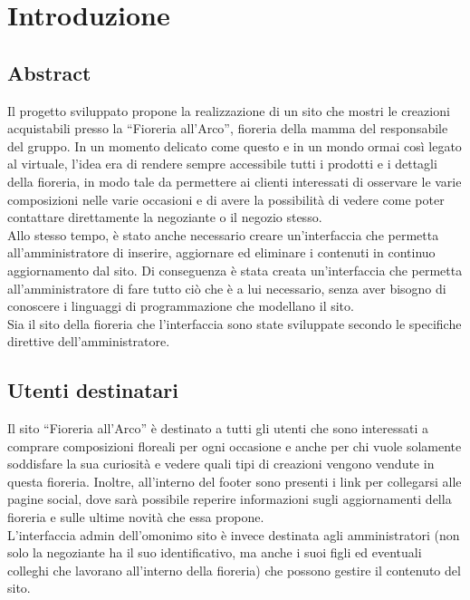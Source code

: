 \section{Introduzione}
\subsection{Abstract}
Il progetto sviluppato propone la realizzazione di un sito che mostri le creazioni acquistabili presso la “Fioreria all’Arco”, fioreria della mamma del responsabile del gruppo. In un momento delicato come questo e in un mondo ormai così legato al virtuale, l’idea era di rendere sempre accessibile tutti i prodotti e i dettagli della fioreria, in modo tale da permettere ai clienti interessati di osservare le varie composizioni nelle varie occasioni e di avere la possibilità di vedere come poter contattare direttamente la negoziante o il negozio stesso.\\
Allo stesso tempo, è stato anche necessario creare un’interfaccia che permetta all'amministratore di inserire, aggiornare ed eliminare i contenuti in continuo aggiornamento dal sito. Di conseguenza è stata creata un’interfaccia che permetta all’amministratore di fare tutto ciò che è a lui necessario, senza aver bisogno di conoscere i linguaggi di programmazione che modellano il sito. \\
Sia il sito della fioreria che l’interfaccia sono state sviluppate secondo le specifiche direttive dell’amministratore.


\subsection{Utenti destinatari}
Il sito “Fioreria all’Arco” è destinato a tutti gli utenti che sono interessati a comprare composizioni floreali per ogni occasione e anche per chi vuole solamente soddisfare la sua curiosità e vedere quali tipi di creazioni vengono vendute in questa fioreria. 
Inoltre, all’interno del footer sono presenti i link per collegarsi alle pagine social, dove sarà possibile reperire informazioni sugli aggiornamenti della fioreria e sulle ultime novità che essa propone.\\
L’interfaccia admin dell’omonimo sito è invece destinata agli amministratori (non solo la negoziante ha il suo identificativo, ma anche i suoi figli ed eventuali colleghi che lavorano all’interno della fioreria) che possono gestire il contenuto del sito.



